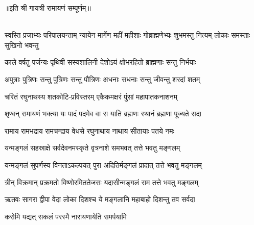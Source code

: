 ॥इति श्री गायत्री रामायणं सम्पूर्णम्॥

\mbox{}\\
\resetShloka
{}
\fourlineindentedshloka
{स्वस्ति प्रजाभ्यः परिपालयन्ताम्}
{न्यायेन मार्गेण महीं महीशाः}
{गोब्राह्मणेभ्यः शुभमस्तु नित्यम्}
{लोकाः समस्ताः सुखिनो भवन्तु}

\twolineshloka
{काले वर्षतु पर्जन्यः पृथिवी सस्यशालिनी}
{देशोऽयं क्षोभरहितो ब्राह्मणाः सन्तु निर्भयाः}

\twolineshloka
{अपुत्राः पुत्रिणः सन्तु पुत्रिणः सन्तु पौत्रिणः}
{अधनाः सधनाः सन्तु जीवन्तु शरदां शतम्}

\twolineshloka
{चरितं रघुनाथस्य शतकोटि-प्रविस्तरम्}
{एकैकमक्षरं पुंसां महापातकनाशनम्}

\twolineshloka
{शृण्वन् रामायणं भक्त्या यः पादं पदमेव वा}
{स याति ब्रह्मणः स्थानं ब्रह्मणा पूज्यते सदा}

\twolineshloka
{रामाय रामभद्राय रामचन्द्राय वेधसे}
{रघुनाथाय नाथाय सीतायाः पतये नमः}

\twolineshloka
{यन्मङ्गलं सहस्राक्षे सर्वदेवनमस्कृते}
{वृत्रनाशे समभवत् तत्ते भवतु मङ्गलम्}

\twolineshloka
{यन्मङ्गलं सुपर्णस्य विनताऽकल्पयत् पुरा}
{अदितिर्मङ्गलं प्रादात् तत्ते भवतु मङ्गलम्}

\twolineshloka
{त्रीन् विक्रमान् प्रक्रमतो विष्णोरमिततेजसः}
{यदासीन्मङ्गलं राम तत्ते भवतु मङ्गलम्}

\twolineshloka
{ऋतवः सागरा द्वीपा वेदा लोका दिशश्च ये}
{मङ्गलानि महाबाहो दिशन्तु तव सर्वदा}

{करोमि यद्यत् सकलं परस्मै नारायणायेति समर्पयामि}
